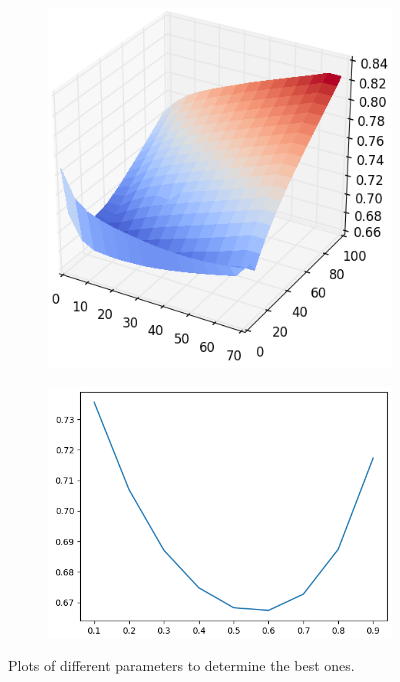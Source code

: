 \documentclass{article}
\begin{document}
\paragraph*{}
\begin{figure}
  \centering
  \vspace{-5mm}
\begin{subfigure}{4.0cm}
  \centering
  \includegraphics[width=0.95\linewidth]{figures/euclidian}
  \caption{}
\end{subfigure}%
\begin{subfigure}{4.0cm}
  \centering
  \includegraphics[width=0.95\linewidth]{figures/euclidian_th}
  \caption{}
\end{subfigure}
\caption{Plots of different parameters to determine the best ones.\label{fig:thresholds}}
\end{figure}
\end{document}
